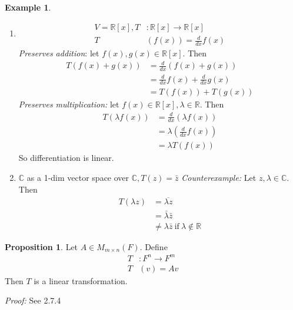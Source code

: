 \documentclass{report}
\theoremstyle{remark}
\theoremstyle{definition}
\theoremstyle{definition}
\newtheorem{example}[theorem]{Example}
\theoremstyle{theorem}
\newtheorem{proposition}[theorem]{Proposition}
\begin{document}
\begin{example}
\begin{enumerate}
\begin{align*}
\begin{pmatrix}
        \end{pmatrix}\right)\\
        &= \lambda x + \lambda y\\
        &= \lambda(x+y) = \lambda T(v)
    \end{align*} 
    \item \begin{align*}
        V = \mathbb{R}[x], T&:\mathbb{R}[x] \rightarrow \mathbb{R}[x]\\
        T&(f(x)) = \frac{d}{dx}f(x)
    \end{align*}
    \emph{Preserves addition}: let $f(x), g(x) \in \mathbb{R}[x]$. Then
    \begin{align*}
        T(f(x) + g(x)) &= \frac{d}{dx}(f(x) + g(x))\\
        &= \frac{d}{dx}f(x) + \frac{d}{dx}g(x)\\
        &= T(f(x)) + T(g(x))
    \end{align*}
    \emph{Preserves multiplication:} let $f(x) \in \mathbb{R}[x], \lambda \in \mathbb{R}$. Then
    \begin{align*}
        T(\lambda f(x)) &= \frac{d}{dx} (\lambda f(x))\\
        &= \lambda \left(\frac{d}{dx}f(x)\right)\\
        &= \lambda T(f(x))
    \end{align*}
    So differentiation is linear.
    \item $\mathbb{C}$ as a 1-dim vector space over $\mathbb{C}, T(z) = \bar{z}$
    \emph{Counterexample:} Let $z, \lambda \in \mathbb{C}$. Then
    \begin{align*}
        T(\lambda z) &= \overline{\lambda z}\\
        &= \bar{\lambda} \bar{z}\\
        &\neq \lambda \bar{z}\> \mathrm{if} \> \lambda \notin \mathbb{R}
    \end{align*}
\end{enumerate}
\end{example}
\begin{proposition}
Let $A \in M_{m \times n}(F)$. Define
\begin{align*}
    T&:F^n \rightarrow F^m\\
    T&(v)= Av
\end{align*}
Then $T$ is a linear transformation.
\end{proposition}
\emph{Proof:} See 2.7.4
\end{document}
